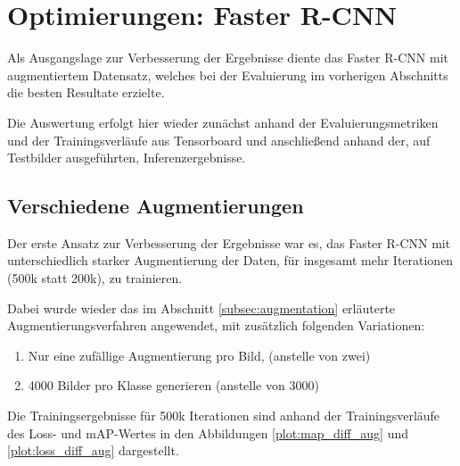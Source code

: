 \section{Optimierungen: Faster R-CNN}
\label{sec:optimierung_faster_rcnn}

Als Ausgangslage zur Verbesserung der Ergebnisse diente 
das Faster R-CNN mit augmentiertem Datensatz, welches
bei der Evaluierung im vorherigen Abschnitts die besten
Resultate erzielte.

Die Auswertung erfolgt hier wieder zunächst 
anhand der Evaluierungsmetriken und der Trainingsverläufe
aus Tensorboard und anschließend anhand der,
auf Testbilder ausgeführten, Inferenzergebnisse.



\subsection{Verschiedene Augmentierungen}

Der erste Ansatz zur Verbesserung der Ergebnisse war es,
das Faster R-CNN mit unterschiedlich starker Augmentierung
der Daten, für insgesamt mehr Iterationen
(500k statt 200k), zu trainieren.

Dabei wurde wieder das im Abschnitt \ref{subsec:augmentation} 
erläuterte Augmentierungsverfahren angewendet, mit zusätzlich 
folgenden Variationen:

\begin{enumerate}
  \item Nur eine zufällige Augmentierung pro Bild, (anstelle von zwei)
  \item 4000 Bilder pro Klasse generieren (anstelle von 3000) 
\end{enumerate}

Die Trainingsergebnisse für 500k Iterationen sind anhand der 
Trainingsverläufe des Loss- und mAP-Wertes in den Abbildungen
\ref{plot:map_diff_aug} und \ref{plot:loss_diff_aug} dargestellt.
\vspace{1cm}

\begin{minipage}{0.5\textwidth}
  \centering
  \def\svgwidth{0.9\textwidth}
  
  \label{plot:map_diff_aug}
\end{minipage}
\begin{minipage}{0.5\textwidth}
  \centering
  \def\svgwidth{0.9\textwidth}
  
  \label{plot:loss_diff_aug}
\end{minipage}

